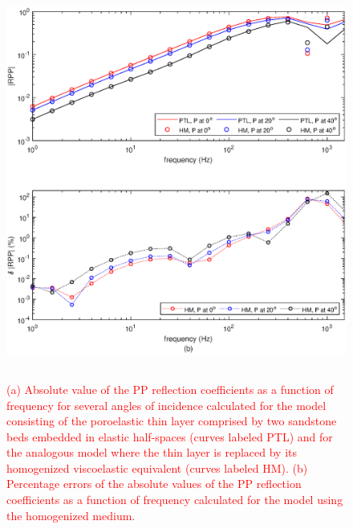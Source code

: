 \documentclass[draft]{agujournal2019}
\newcommand{\red}{\textcolor{red}}
\begin{document}
\begin{figure}[!ht]
\centering
        \includegraphics[width= 130mm, height=130mm]{Figure3.eps}
\caption{\red{ (a) Absolute value of the PP reflection coefficients as a function of frequency for several angles of incidence calculated for the model consisting of the poroelastic thin layer comprised by two sandstone beds embedded in elastic half-spaces (curves labeled PTL) and for the analogous model where the thin layer is replaced by its homogenized viscoelastic equivalent (curves labeled HM). (b) Percentage errors of the absolute values of the PP reflection coefficients as a function of frequency calculated for the model using the homogenized medium.}}
\label{fig.3}
\end{figure}
\end{document}
